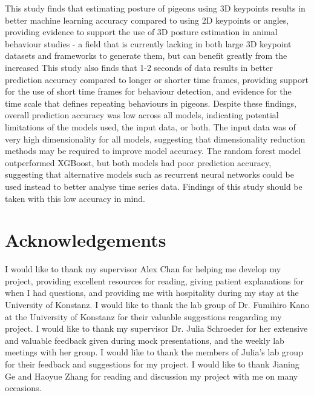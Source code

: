 \documentclass[11pt, letterpaper]{article} %
\begin{document}
\noindent This study finds that estimating posture of pigeons using 3D keypoints results in better machine learning accuracy compared to using 2D keypoints or angles, providing evidence to support the use of 3D posture estimation in animal behaviour studies - a field that is currently lacking in both large 3D keypoint datasets and frameworks to generate them, but can benefit greatly from the increased  This study also finds that 1-2 seconds of data results in better prediction accuracy compared to longer or shorter time frames, providing support for the use of short time frames for behaviour detection, and evidence for the time scale that defines repeating behaviours in pigeons. Despite these findings, overall prediction accuracy was low across all models, indicating potential limitations of the models used, the input data, or both. The input data was of very high dimensionality for all models, suggesting that dimensionality reduction methods may be required to improve model accuracy. The random forest model outperformed XGBoost, but both models had poor prediction accuracy, suggesting that alternative models such as recurrent neural networks could be used instead to better analyse time series data. Findings of this study should be taken with this low accuracy in mind.



\newpage
\section*{Acknowledgements}
I would like to thank my supervisor Alex Chan for helping me develop my project, providing excellent resources for reading, giving patient explanations for when I had questions, and providing me with hospitality during my stay at the University of Konstanz. I would like to thank the lab group of Dr. Fumihiro Kano at the University of Konstanz for their valuable suggestions reagarding my project. I would like to thank my supervisor Dr. Julia Schroeder for her extensive and valuable feedback given during mock presentations, and the weekly lab meetings with her group. I would like to thank the members of Julia's lab group for their feedback and suggestions for my project. I would like to thank Jianing Ge and Haoyue Zhang for reading and discussion my project with me on many occasions. 
\end{document}
